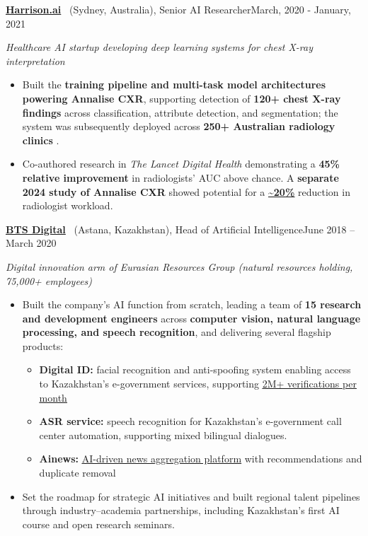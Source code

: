 \documentclass[11pt,a4paper]{article}
\newcommand{\TitleFont}{\fontsize{12.8}{15.8}\selectfont}
\newcommand{\DateFont}{\fontsize{12.1}{15.0}\selectfont}
\newcommand{\DescFont}{\fontsize{10.2}{12.7}\selectfont}
\newcommand{\muted}[1]{\textcolor{secondary}{#1}}
\newcommand{\softuline}[1]{\textcolor{secondary}{\uline{#1}}}
\newcommand{\cvlink}[2]{%
  \href{#2}{\softuline{#1}}%
}
\newcommand{\metric}[1]{%
  \textcolor{accent}{\textbf{#1}}%
}
\newcommand{\companylink}[2]{%
  \href{#2}{\textcolor{textgray}{#1}}%
}
\newcommand{\jobtitle}[4]{%
  {\TitleFont\bfseries #1}{\TitleFont\textnormal{\muted{\ (#2)}}}{\TitleFont\textnormal{, #3}}\hfill{\DateFont\textnormal{\muted{#4}}}\par
}
\newcommand{\jobgap}{\vspace{0.55em}}
\begin{document}
\jobgap
{}
\jobtitle{\companylink{Harrison.ai}{https://harrison.ai/}}{Sydney, Australia}{Senior AI Researcher}{March, 2020 - January, 2021}
{\DescFont\muted{\textit{Healthcare AI startup developing deep learning systems for chest X-ray interpretation}}\par}
\begin{itemize}
  \item Built the \textbf{training pipeline and multi-task model architectures powering Annalise CXR}, supporting detection of \metric{120+ chest X-ray findings} across classification, attribute detection, and segmentation; the system was subsequently deployed across \metric{250+ Australian radiology clinics}.
  \item Co-authored research in \textit{The Lancet Digital Health} demonstrating a \metric{45\% relative improvement} in radiologists' AUC above chance. A \textbf{separate 2024 study of Annalise CXR} showed potential for a \cvlink{\textbf{\textasciitilde20\%}}{https://pubs.rsna.org/doi/10.1148/radiol.240272} reduction in radiologist workload.
\end{itemize}

\jobgap
{}
\jobtitle{\companylink{BTS Digital}{https://btsdigital.kz/eng}}{Astana, Kazakhstan}{Head of Artificial Intelligence}{June 2018 -- March 2020}
{\DescFont\muted{\textit{Digital innovation arm of Eurasian Resources Group (natural resources holding, 75,000+ employees)}}\par}
\begin{itemize}
  \item Built the company's AI function from scratch, leading a team of \metric{15 research and development engineers} across \textbf{computer vision, natural language processing, and speech recognition}, and delivering several flagship products:
  \begin{itemize}
    \item \textbf{Digital ID:} facial recognition and anti-spoofing system enabling access to Kazakhstan's e-government services, supporting \cvlink{2M+ verifications per month}{https://www.csis.org/analysis/building-digital-public-infrastructure-lessons-learned-kazakhstan}
    \item \textbf{ASR service:} speech recognition for Kazakhstan's e-government call center automation, supporting mixed bilingual dialogues.
    \item \textbf{Ainews:} \cvlink{AI-driven news aggregation platform}{https://ai-news.kz/} with recommendations and duplicate removal
  \end{itemize}
  \item Set the roadmap for strategic AI initiatives and built regional talent pipelines through industry--academia partnerships, including Kazakhstan’s first AI course and open research seminars.
\end{itemize}
\end{document}
